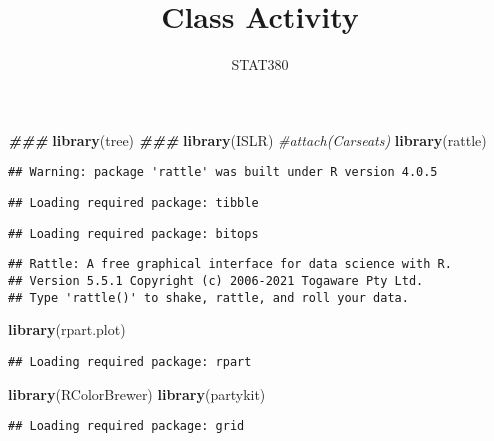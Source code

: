 \documentclass[
]{article}
\title{Class Activity}
\author{STAT380}
\date{}
\newenvironment{Shaded}{\begin{snugshade}}{\end{snugshade}}
\newcommand{\CommentTok}[1]{\textcolor[rgb]{0.56,0.35,0.01}{\textit{#1}}}
\newcommand{\DocumentationTok}[1]{\textcolor[rgb]{0.56,0.35,0.01}{\textbf{\textit{#1}}}}
\newcommand{\FunctionTok}[1]{\textcolor[rgb]{0.13,0.29,0.53}{\textbf{#1}}}
\newcommand{\NormalTok}[1]{#1}
\begin{document}
\maketitle

\begin{Shaded}
\begin{Highlighting}[]
\DocumentationTok{\#\#\#}
\FunctionTok{library}\NormalTok{(tree)}
\DocumentationTok{\#\#\#}
\FunctionTok{library}\NormalTok{(ISLR)}
\CommentTok{\#attach(Carseats)}
\FunctionTok{library}\NormalTok{(rattle)}
\end{Highlighting}
\end{Shaded}

\begin{verbatim}
## Warning: package 'rattle' was built under R version 4.0.5
\end{verbatim}

\begin{verbatim}
## Loading required package: tibble
\end{verbatim}

\begin{verbatim}
## Loading required package: bitops
\end{verbatim}

\begin{verbatim}
## Rattle: A free graphical interface for data science with R.
## Version 5.5.1 Copyright (c) 2006-2021 Togaware Pty Ltd.
## Type 'rattle()' to shake, rattle, and roll your data.
\end{verbatim}

\begin{Shaded}
\begin{Highlighting}[]
\FunctionTok{library}\NormalTok{(rpart.plot)}
\end{Highlighting}
\end{Shaded}

\begin{verbatim}
## Loading required package: rpart
\end{verbatim}

\begin{Shaded}
\begin{Highlighting}[]
\FunctionTok{library}\NormalTok{(RColorBrewer)}
\FunctionTok{library}\NormalTok{(partykit)}
\end{Highlighting}
\end{Shaded}

\begin{verbatim}
## Loading required package: grid
\end{verbatim}
\end{document}
